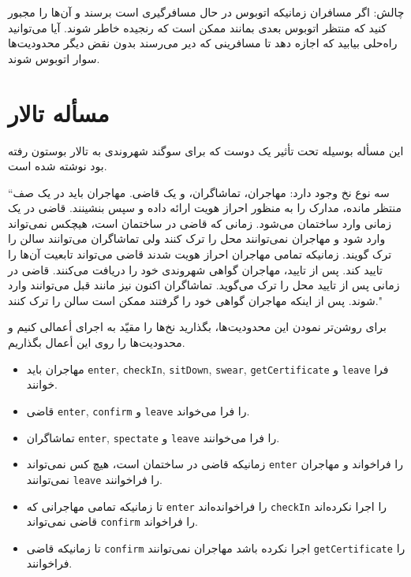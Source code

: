 \documentclass{book}
\newcommand{\clearemptydoublepage}{\newpage\cleardoublepage}
\begin{document}
    چالش: اگر مسافران زمانیکه اتوبوس در حال مسافرگیری است برسند و آن‌ها را مجبور کنید که منتظر اتوبوس بعدی بمانند ممکن است که رنجیده خاطر شوند. 
    آیا می‌توانید راه‌حلی بیابید که اجازه دهد تا مسافرینی که دیر می‌رسند بدون نقض دیگر محدودیت‌ها سوار اتوبوس شوند. 
    


\clearemptydoublepage
\section{مسأله تالار }

    این مسأله بوسیله  تحت تأثیر یک دوست که  برای سوگند شهروندی به تالار   بوستون رفته بود نوشته شده است.

    ``سه نوع نخ وجود دارد: مهاجران، تماشاگران، و یک قاضی. مهاجران باید در یک صف منتظر مانده، مدارک را به منظور احراز هویت ارائه داده  و سپس بنشینند. 
    قاضی در یک زمانی وارد ساختمان می‌شود. زمانی که قاضی در ساختمان است، هیچکس نمی‌تواند وارد شود و مهاجران نمی‌توانند محل را ترک کنند ولی 
    تماشاگران می‌توانند سالن را ترک گویند. زمانیکه تمامی مهاجران احراز هویت شدند قاضی می‌تواند تابعیت آن‌ها را تایید کند. پس از تایید، مهاجران 
    گواهی شهروندی خود را دریافت می‌کنند. قاضی در زمانی پس از تایید محل را ترک می‌گوید. تماشاگران اکنون نیز مانند قبل می‌توانند وارد شوند. 
    پس از اینکه مهاجران گواهی‌ خود را گرفتند ممکن است سالن را ترک کنند." 

    برای روشن‌تر نمودن این محدودیت‌ها، بگذارید نخ‌ها را مقیّد به اجرای أعمالی کنیم و محدودیت‌ها را روی این أعمال بگذاریم. 

\begin{itemize}

\item
    مهاجران باید {\tt enter}, {\tt checkIn}, {\tt sitDown}, {\tt swear}, {\tt getCertificate} و {\tt leave} 
    فرا خوانند. 

\item
    قاضی {\tt enter}, {\tt confirm} و {\tt leave}  را فرا می‌خواند. 

\item
    تماشاگران {\tt enter}, {\tt spectate} و {\tt leave} را فرا می‌خوانند. 

\item
    زمانیکه قاضی در ساختمان است، هیچ کس نمی‌تواند {\tt enter} را فراخواند و مهاجران نمی‌توانند  {\tt leave} را فراخوانند. 

\item
    تا زمانیکه تمامی مهاجرانی که {\tt enter} را فراخوانده‌اند  {\tt checkIn} را  اجرا نکرده‌اند  قاضی نمی‌تواند  {\tt confirm} را فراخواند.

\item
    تا زمانیکه قاضی {\tt confirm} اجرا نکرده باشد مهاجران نمی‌توانند {\tt getCertificate} را فراخوانند. 

\end{itemize}
\end{document}

